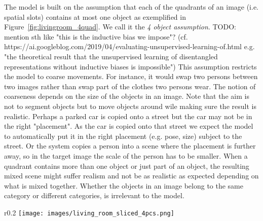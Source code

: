\documentclass[12pt,a4paper]{article}
\begin{document}
The model is built on the assumption that each of the quadrants of an image (i.e. spatial slots) contains at most one object as exemplified in Figure~\ref{fig:livingroom_4quad}. We call it the \textit{4 object assumption}. TODO: mention sth like "this is the inductive bias we impose"? (cf. https://ai.googleblog.com/2019/04/evaluating-unsupervised-learning-of.html e.g. "the theoretical result that the unsupervised learning of disentangled representations without inductive biases is impossible") This assumption restricts the model to coarse movements. For instance, it would swap two persons between two images rather than swap part of the clothes two persons wear. The notion of coarseness depends on the size of the objects in an image. Note that the aim is not to segment objects but to move objects around wile making sure the result is realistic. Perhaps a parked car is copied onto a street but the car may not be in the right "placement". As the car is copied onto that street we expect the model to automatically put it in the right placement (e.g. pose, size) subject to the street. Or the system copies a person into a scene where the placement is further away, so in the target image the scale of the person has to be smaller. When a quadrant contains more than one object or just part of an object, the resulting mixed scene might suffer realism and not be as realistic as expected depending on what is mixed together. Whether the objects in an image belong to the same category or different categories, is irrelevant to the model.

\begin{wrapfigure}{r}{0.2\textwidth}
\texttt{[image: images/living\_room\_sliced\_4pcs.png]} 
\caption{An image split into quadrants.} %
\label{fig:livingroom_4quad}
\end{wrapfigure}
\end{document}
